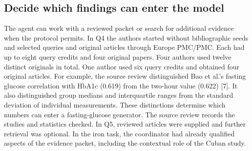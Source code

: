 \documentclass[11pt,letterpaper]{article}
\begin{document}
\subsection{Decide which findings can enter the model}

The agent can work with a reviewed packet or search for additional evidence when the protocol permits. In Q4 the authors started without bibliographic seeds and selected queries and original articles through Europe PMC/\allowbreak{}PMC. Each had up to eight query credits and four original papers. Four authors used twelve distinct originals in total. One author used six query credits and obtained four original articles. For example, the source review distinguished Bao et al.'s fasting glucose correlation with HbA1c (0.619) from the two-hour value (0.622) [7]. It also distinguished group medians and interquartile ranges from the standard deviation of individual measurements. These distinctions determine which numbers can enter a fasting-glucose generator. The source review records the studies and statistics checked. In Q5, reviewed articles were supplied and further retrieval was optional. In the iron task, the coordinator had already qualified aspects of the evidence packet, including the contextual role of the Cuban study.


\FloatBarrier


\FloatBarrier

\begingroup

\small

\renewcommand{\arraystretch}{1.22}
\end{document}
